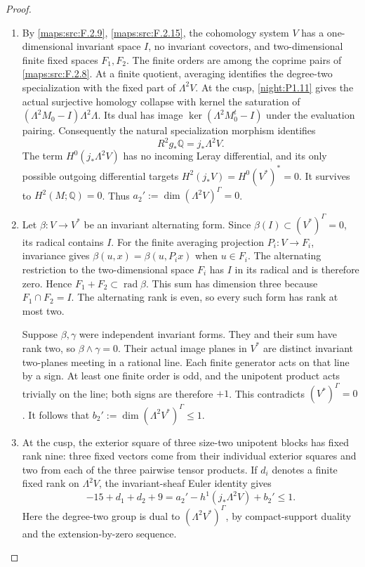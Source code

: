 \begin{proof}
\begin{enumerate}[label=\arabic*.]
\item By \cref{maps:src:F.2.9}, \cref{maps:src:F.2.15}, the cohomology
system $V$ has a one-dimensional invariant space $I$, no invariant
covectors, and two-dimensional finite fixed spaces $F_1,F_2$.
The finite orders are among the coprime pairs of
\cref{maps:src:F.2.8}.  At a finite quotient, averaging identifies
the degree-two specialization with the fixed part of $\Lambda^2V$.
At the cusp, \cref{night:P1.11} gives the actual surjective homology
collapse with kernel the saturation of
$(\Lambda^2M_0-I)\Lambda^2\Lambda$.  Its dual has image
$\ker(\Lambda^2M_0^t-I)$ under the evaluation pairing.  Consequently
the natural specialization morphism identifies
\[
 R^2g_*\mathbb Q=j_*\Lambda^2V.
\]
The term $H^0(j_*\Lambda^2V)$ has no incoming Leray differential,
and its only possible outgoing differential targets
$H^2(j_*V)=H^0(V^*)^*=0$.  It survives to $H^2(M;\mathbb Q)=0$.
Thus $a_2':=\dim(\Lambda^2V)^\Gamma=0$.

\item Let $\beta:V\to V^*$ be an invariant alternating form.
Since $\beta(I)\subset(V^*)^\Gamma=0$, its radical contains $I$.
For the finite averaging projection $P_i:V\to F_i$, invariance gives
$\beta(u,x)=\beta(u,P_ix)$ when $u\in F_i$.
The alternating restriction to the two-dimensional space $F_i$
has $I$ in its radical and is therefore zero.  Hence
$F_1+F_2\subset\operatorname{rad}\beta$.  This sum has dimension
three because $F_1\cap F_2=I$.  The alternating rank is even,
so every such form has rank at most two.

Suppose $\beta,\gamma$ were independent invariant forms.
They and their sum have rank two, so
$\beta\wedge\gamma=0$.  Their actual image planes in $V^*$
are distinct invariant two-planes meeting in a rational line.
Each finite generator acts on that line by a sign.  At least one
finite order is odd, and the unipotent product acts trivially on the
line; both signs are therefore $+1$.  This contradicts
$(V^*)^\Gamma=0$.  It follows that
$b_2':=\dim(\Lambda^2V^*)^\Gamma\leq1$.

\item At the cusp, the exterior square of three size-two unipotent
blocks has fixed rank nine: three fixed vectors come from their
individual exterior squares and two from each of the three pairwise
tensor products.  If $d_i$ denotes a finite fixed rank on
$\Lambda^2V$, the invariant-sheaf Euler identity gives
\[
 -15+d_1+d_2+9
 =a_2'-h^1(j_*\Lambda^2V)+b_2'\leq1.
 \tag{F.40}\label{maps:eq:F.40}
\]
Here the degree-two group is dual to
$(\Lambda^2V^*)^\Gamma$, by compact-support duality and the
extension-by-zero sequence.


\end{enumerate}
\end{proof}
